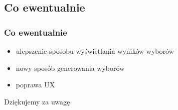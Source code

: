\documentclass{beamer}
\begin{document}

\subsection{Co ewentualnie}

\begin{frame}

\frametitle{Co ewentualnie}
\begin{itemize}
\item ulepszenie sposobu wyświetlania wyników wyborów
\item nowy sposób generowania wyborów
\item poprawa UX
\end{itemize}

\end{frame}


\begin{frame}
\Huge{\centerline{Dziękujemy za uwagę}}
\end{frame}
\end{document}
